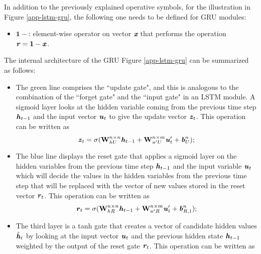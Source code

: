 In addition to the previously explained operative symbols, for the illustration in Figure \ref{app-lstm-gru}, the following one needs to be defined for GRU modules:
\begin{itemize}
	\item $ \boxed{\bm1-} $: element-wise operator on vector $ \textit{\textbf{x}} $ that performs the operation $ \textbf{\textit{r}}=\bm1-\textbf{\textit{x}} $.
\end{itemize}

The internal architecture of the GRU  Figure \ref{app-lstm-gru} can be summarized as follows:
\begin{itemize}
	\item The green line comprises the ``update gate", and this is analogous to the combination of the ``forget gate" and the ``input gate" in an LSTM module. A sigmoid layer looks at the hidden variable coming from the previous time step $ \textbf{\textit{h}}_{t-1} $ and the input vector $ \textbf{\textit{u}}_t $ to give the update vector $ \textbf{\textit{z}}_t $. This operation can be written as 
	\begin{equation}\label{app-lstm-gru-1}
	\textbf{\textit{z}}_t = \sigma(\textbf{W}^{n\times n}_{hU}\textbf{\textit{h}}_{t-1}+\textbf{W}^{n\times m}_{u'U}\textbf{\textit{u}}'_{t}+\textbf{\textit{b}}^n_{U});
	\end{equation}
	\item The blue line displays the reset gate that applies a sigmoid layer on the hidden variables from the previous time step $ \textbf{\textit{h}}_{t-1} $ and the input variable $ \textbf{\textit{u}}_t $ which will decide the values in the hidden variables from the previous time step that will be replaced with the vector of new values stored in the reset vector $ \textbf{\textit{r}}_t $. This operation can be written as 
	\begin{equation}\label{app-lstm-gru-2}
	\textbf{\textit{r}}_t = \sigma(\textbf{W}^{n\times n}_{hR}\textbf{\textit{h}}_{t-1}+\textbf{W}^{n\times m}_{u'R}\textbf{\textit{u}}'_{t}+\textbf{\textit{b}}^n_{R,1});
	\end{equation}
	\item The third layer is a tanh gate that creates a vector of candidate hidden values $ \tilde{\textbf{\textit{h}}}_t $ by looking at the input vector $ \textbf{\textit{u}}_t $ and the previous hidden state $ \textbf{\textit{h}}_{t-1} $ weighted by the output of the reset gate $ \textbf{\textit{r}}_t $. This operation can be written as
	\begin{equation}\label{app-lstm-gru-3}

\end{equation}
\end{itemize}
